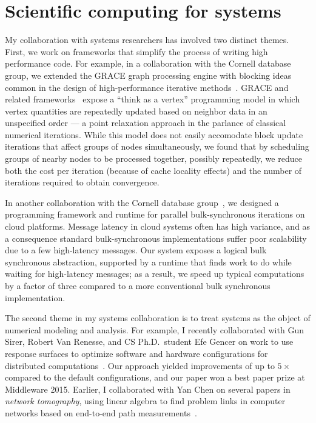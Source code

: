 \documentclass[11pt]{amsart}
\begin{document}
\section{Scientific computing for systems}
\label{sec-sc-systems}

My collaboration with systems researchers has involved two distinct
themes. First, we work on frameworks that simplify the process of
writing high performance code.  For example, in a collaboration with the
Cornell database group, we extended the GRACE graph processing engine
with blocking ideas common in the design of high-performance iterative
methods~\cite{2013-blockgrace}.  GRACE and related
frameworks~\cite{Low:2010:GraphLab,Kyrola:2012:GLG,Malewicz:2010:PSL}
expose a ``think as a vertex'' programming model in which vertex
quantities are repeatedly updated based on neighbor data in an
unspecified order --- a point relaxation approach in the parlance
of classical numerical iterations.  While this model does not easily
accomodate block update iterations that affect groups of nodes
simultaneously, we found that by scheduling groups of nearby nodes to
be processed together, possibly repeatedly, we reduce both the cost
per iteration (because of cache locality effects) and the
number of iterations required to obtain convergence.

In another collaboration with the Cornell database
group~\cite{2011-socc}, we designed a programming framework and runtime
for parallel bulk-synchronous iterations on cloud platforms.
Message latency in cloud systems often has high variance, and as a
consequence standard bulk-synchronous implementations suffer poor
scalability due to a few high-latency messages.  Our system exposes
a logical bulk synchronous abstraction, supported by a runtime that
finds work to do while waiting for high-latency messages; as a result,
we speed up typical computations by a factor of three compared to a more
conventional bulk synchronous implementation.


The second theme in my systems collaboration is to treat systems as the
object of numerical modeling and analysis. For example, I recently
collaborated with Gun Sirer, Robert Van Renesse, and CS Ph.D.~student
Efe Gencer on work to use response surfaces to optimize software and
hardware configurations for distributed
computations~\cite{2015-middleware}.  Our approach yielded improvements
of up to $5 \times$ compared to the default configurations, and our
paper won a best paper prize at Middleware 2015.  Earlier, I
collaborated with Yan Chen on several papers in {\em network
tomography}, using linear algebra to find problem links in computer
networks based on end-to-end path
measurements~\cite{2009-tons,2007-tons,2006-sigcomm,2006-sigmetrics,2004-sigcomm,2003-imc}.
\end{document}

